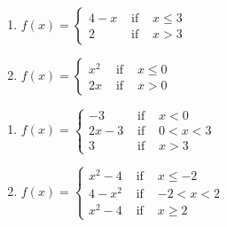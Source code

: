 \begin{multicols}{2}
\begin{enumerate}
\setcounter{enumi}{\value{HW}}

\item ${\displaystyle f(x) = \left\{ \begin{array}{rcl} 4-x & \mbox{ if } &  x \leq 3 \\
                                                            2 & \mbox{ if } & x > 3 
                                     \end{array} \right. }$ \label{sketchpiecefirst}

\item ${\displaystyle f(x) = \left\{ \begin{array}{rcl} x^2 & \mbox{ if } & x \leq 0 \\
                                                     2x & \mbox{ if } & x > 0
                                  \end{array} \right. }$

\setcounter{HW}{\value{enumi}}
\end{enumerate}
\end{multicols}


\begin{multicols}{2}
\begin{enumerate}
\setcounter{enumi}{\value{HW}}

\item ${\displaystyle f(x) = \left\{ \begin{array}{rcl}  -3 & \mbox{ if } & x < 0 \\
                                                        2x-3 & \mbox{ if } & 0 < x < 3 \\
                                                            3 & \mbox{ if } & x > 3  
                                     \end{array} \right. }$

\item ${\displaystyle f(x) = \left\{ \begin{array}{rcl} x^2 - 4 & \mbox{ if } &x \leq -2\\
                                                                  4-x^2 & \mbox{ if } & -2 < x < 2 \\
                                                         x^2-4 & \mbox{ if } & x \geq 2 
                                     \end{array} \right. }$


\setcounter{HW}{\value{enumi}}
\end{enumerate}
\end{multicols}


